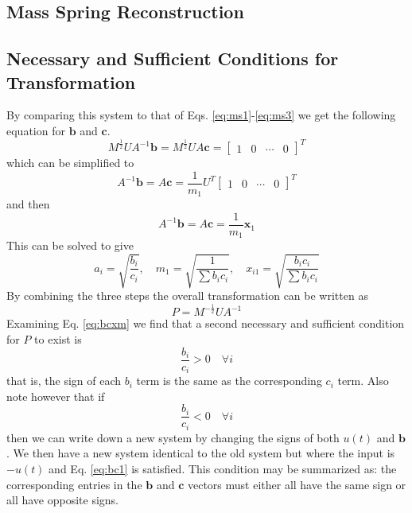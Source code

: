 \documentclass{beamer}
\begin{document}
\subsection{Mass Spring Reconstruction}
\begin{frame}
\end{frame}

\subsection{Necessary and Sufficient Conditions for Transformation}
\begin{frame}
By comparing this system to that of Eqs. \ref{eq:ms1}-\ref{eq:ms3} we get the following equation for $\mathbf{b}$ and $\mathbf{c}$.
\begin{equation}
M^{\frac{1}{2}} U A^{-1} \mathbf{b} = M^{\frac{1}{2}} U A \mathbf{c} = \begin{bmatrix} 1 &  0 & \cdots & 0 \end{bmatrix}^T
\label{eq:bhat}
\end{equation}
which can be simplified to
\begin{equation}
A^{-1} \mathbf{b} = A \mathbf{c} = \frac{1}{m_1} U^T \begin{bmatrix} 1 &  0 & \cdots & 0 \end{bmatrix}^T
\label{eq:bc1}
\end{equation}
and then
\begin{equation}
A^{-1} \mathbf{b} = A \mathbf{c} = \frac{1}{m_1} \mathbf{x}_1
\label{eq:bc2}
\end{equation}
This can be solved to give
\begin{equation}
a_i = \sqrt{\frac{b_i}{c_i}} ,\quad m_1 = \sqrt{\frac{1}{\sum b_i c_i}} ,\quad x_{i1} = \sqrt{\frac{b_i c_i}{\sum b_i c_i}}
\label{eq:bcxm}
\end{equation}
By combining the three steps the overall transformation can be written as
\begin{equation}
P =  M^{-\frac{1}{2}} U A^{-1}
\label{eq:p}
\end{equation}
Examining Eq. \ref{eq:bcxm} we find that a second necessary and sufficient condition for $P$ to exist is
\begin{equation}
\frac{b_i}{c_i} > 0 \quad \forall i
\label{eq:bc1}
\end{equation}
that is, the sign of each $b_i$ term is the same as the corresponding $c_i$ term. 
Also note however that if
\begin{equation}
\frac{b_i}{c_i} < 0 \quad \forall i
\label{eq:bc2}
\end{equation}
then we can write down a new system by changing the signs of both $u(t)$ and $\mathbf{b}$. We then have a new system identical to the old system but where the input is $-u(t)$ and Eq. \ref{eq:bc1} is satisfied.
This condition may be summarized as: the corresponding entries in the $\mathbf{b}$ and $\mathbf{c}$ vectors must either all have the same sign or all have opposite signs.
\end{frame}
\end{document}
